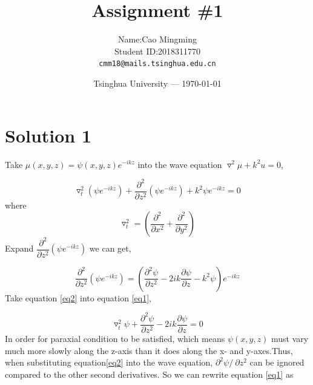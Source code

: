 \documentclass{article}
\title{Assignment \#1} %
\author{Name:Cao Mingming\\ Student ID:2018311770\\ \texttt{cmm18@mails.tsinghua.edu.cn}} %
\date{Tsinghua University --- \today} %
\begin{document}
\maketitle %

\section{Solution 1}

Take $\mu(x,y,z)=\psi(x,y,z)e^{-ikz}$ into the wave equation $\triangledown^2\mu+k^2u=0$, 

\begin{equation}\label{eq1}
 \triangledown _t^2 (\psi e^{-ikz})+\dfrac{\partial^2}{\partial z^2}(\psi e^{-ikz})+k^2\psi e^{-ikz}=0
\end{equation}
where 
$$
\triangledown_t^2=(\dfrac{\partial^2}{\partial x^2}+\dfrac{\partial^2}{\partial y^2})
$$
Expand $\dfrac{\partial^2}{\partial z^2}(\psi e^{-ikz})$ we can get,

\begin{equation}\label{eq2}
\dfrac{\partial^2}{\partial z^2}(\psi e^{-ikz})=(\dfrac{\partial^2 \psi}{\partial z^2}-2ik\dfrac{\partial \psi}{\partial z}-k^2\psi)e^{-ikz}
\end{equation}
Take equation \ref{eq2} into equation \ref{eq1},

\begin{equation}\label{eq3}
 \triangledown _t^2 \psi+\dfrac{\partial^2 \psi}{\partial z^2}-2ik\dfrac{\partial \psi}{\partial z}=0
\end{equation}
In order for paraxial condition to be satisfied, which means $\psi(x,y,z)$ must vary much more slowly along the z-axis than it does along the x- and y-axes.Thus, when substituting
equation\ref{eq2} into the wave equation, $\partial^2\psi/\ \partial z^2$ can be ignored compared to the other second derivatives. So we can rewrite equation \ref{eq1} as
\end{document}
